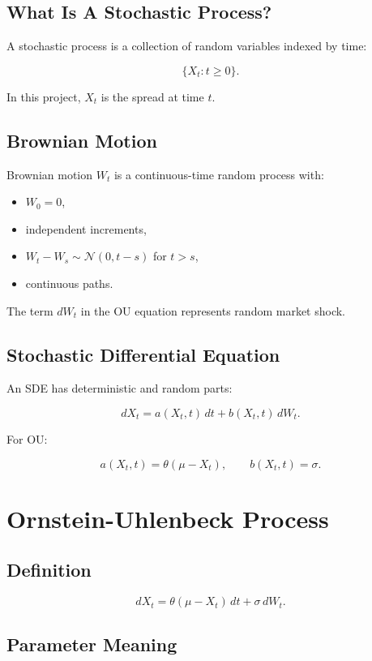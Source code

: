 \documentclass[11pt]{article}
\newcommand{\Normal}{\mathcal{N}}
\begin{document}
\subsection{What Is A Stochastic Process?}

A stochastic process is a collection of random variables indexed by time:

\[
\{X_t : t \geq 0\}.
\]

In this project, $X_t$ is the spread at time $t$.

\subsection{Brownian Motion}

Brownian motion $W_t$ is a continuous-time random process with:

\begin{itemize}
  \item $W_0 = 0$,
  \item independent increments,
  \item $W_t - W_s \sim \Normal(0, t-s)$ for $t > s$,
  \item continuous paths.
\end{itemize}

The term $dW_t$ in the OU equation represents random market shock.

\subsection{Stochastic Differential Equation}

An SDE has deterministic and random parts:

\[
dX_t = a(X_t,t)\,dt + b(X_t,t)\,dW_t.
\]

For OU:

\[
a(X_t,t) = \theta(\mu-X_t),
\qquad
b(X_t,t)=\sigma.
\]

\section{Ornstein-Uhlenbeck Process}

\subsection{Definition}

\[
dX_t = \theta(\mu - X_t)\,dt + \sigma\,dW_t.
\]

\subsection{Parameter Meaning}
\end{document}
